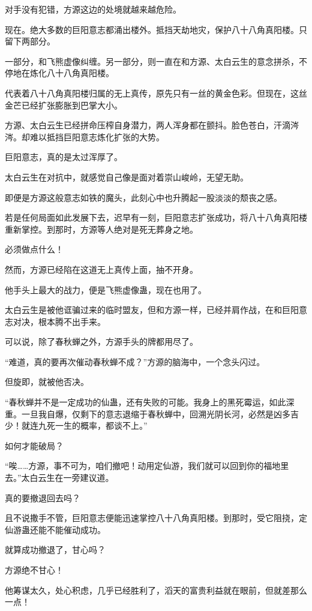 \begin{this_body}
对手没有犯错，方源这边的处境就越来越危险。

现在。绝大多数的巨阳意志都涌出楼外。抵挡天劫地灾，保护八十八角真阳楼。只留下两部分。

一部分，和飞熊虚像纠缠。另一部分，则一直在和方源、太白云生的意念拼杀，不停地在炼化八十八角真阳楼。

代表着八十八角真阳楼归属的无上真传，原先只有一丝的黄金色彩。但现在，这丝金芒已经扩张膨胀到巴掌大小。

方源、太白云生已经拼命压榨自身潜力，两人浑身都在颤抖。脸色苍白，汗滴涔涔。却难以抵挡巨阳意志炼化扩张的大势。

巨阳意志，真的是太过浑厚了。

太白云生在对抗中，就感觉自己像是面对着崇山峻岭，无望无助。

即便是方源这般意志如铁的魔头，此刻心中也升腾起一股淡淡的颓丧之感。

若是任何局面如此发展下去，迟早有一刻，巨阳意志扩张成功，将八十八角真阳楼重新掌控。到那时，方源等人绝对是死无葬身之地。

必须做点什么！

然而，方源已经陷在这道无上真传上面，抽不开身。

他手头上最大的战力，便是飞熊虚像蛊，现在也用了。

太白云生是被他诓骗过来的临时盟友，但和方源一样，已经并肩作战，在和巨阳意志对决，根本腾不出手来。

可以说，除了春秋蝉之外，方源手头的牌都用尽了。

“难道，真的要再次催动春秋蝉不成？”方源的脑海中，一个念头闪过。

但旋即，就被他否决。

“春秋蝉并不是一定成功的仙蛊，还有失败的可能。我身上的黑死霉运，如此深重。一旦我自爆，仅剩下的意志退缩于春秋蝉中，回溯光阴长河，必然是凶多吉少！就连九死一生的概率，都谈不上。”

如何才能破局？

“唉……方源，事不可为，咱们撤吧！动用定仙游，我们就可以回到你的福地里去。”太白云生在一旁建议道。

真的要撤退回去吗？

且不说撒手不管，巨阳意志便能迅速掌控八十八角真阳楼。到那时，受它阻挠，定仙游蛊还能不能催动成功。

就算成功撤退了，甘心吗？

方源绝不甘心！

他筹谋太久，处心积虑，几乎已经胜利了，滔天的富贵利益就在眼前，但就差那么一点！


\end{this_body}
